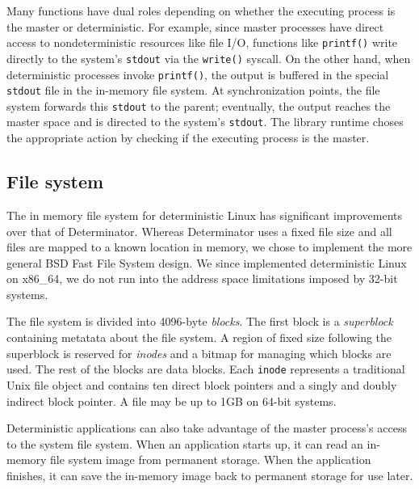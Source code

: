 Many functions have dual roles depending on whether the executing process is
the master or deterministic. For example, since master processes have direct
access to nondeterministic resources like file I/O, functions like
{\tt printf()} write directly to the system's {\tt stdout} via the {\tt write()}
syscall. On the other hand, when deterministic processes invoke {\tt printf()},
the output is buffered in the special {\tt stdout} file in the in-memory file
system. At synchronization points, the file system forwards this {\tt stdout}
to the parent; eventually, the output reaches the master space and is directed
to the system's {\tt stdout}. The library runtime choses the appropriate action
by checking if the executing process is the master.

\subsection{File system} The in memory file system for deterministic Linux has
significant improvements over that of Determinator. Whereas Determinator uses a
fixed file size and all files are mapped to a known location in memory, we chose
to implement the more general BSD Fast File System design. We since implemented
deterministic Linux on x86\_64, we do not run into the address space limitations
imposed by 32-bit systems.

The file system is divided into 4096-byte \emph{blocks}. The first block is a
\emph{superblock} containing metatata about the file system. A region of fixed
size following the superblock is reserved for \emph{inodes} and a bitmap for
managing which blocks are used. The rest of the blocks are data blocks. Each
{\tt inode} represents a traditional Unix file object and contains ten direct
block pointers and a singly and doubly indirect block pointer. A file may be up 
to 1GB on 64-bit systems.

Deterministic applications can also take advantage of the master process's
access to the system file system. When an application starts up, it can read
an in-memory file system image from permanent storage. When the application
finishes, it can save the in-memory image back to permanent storage for use
later.

